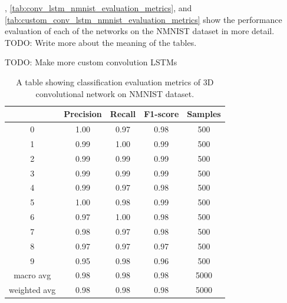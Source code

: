 , \cref{tab:conv_lstm_nmnist_evaluation_metrics}, and \cref{tab:custom_conv_lstm_nmnist_evaluation_metrics} show the performance evaluation of each of the networks on the NMNIST dataset in more detail.
\color{red} TODO: Write more about the meaning of the tables. \color{black}


\color{red} TODO: Make more custom convolution LSTMs \color{black}

\begin{table}[htb]
    \centering
    \begin{tabular}{|| c | c | c | c | c ||}
        \hline
             & Precision & Recall & F1-score & Samples \\
        \hline \hline
        0            & 1.00  & 0.97  & 0.98 & 500 \\
        \hline
        1            & 0.99  & 1.00  & 0.99 & 500 \\
        \hline
        2            & 0.99  & 0.99  & 0.99 & 500 \\
        \hline
        3            & 0.99  & 0.99  & 0.99 & 500 \\
        \hline
        4            & 0.99  & 0.97  & 0.98 & 500 \\
        \hline
        5            & 1.00  & 0.98  & 0.99 & 500 \\
        \hline
        6            & 0.97  & 1.00  & 0.98 & 500 \\
        \hline
        7            & 0.98  & 0.97  & 0.98 & 500 \\
        \hline
        8            & 0.97  & 0.97  & 0.97 & 500 \\
        \hline
        9            & 0.95  & 0.98  & 0.96 & 500 \\
        \hline
        macro avg    & 0.98  & 0.98  & 0.98 & 5000 \\
        \hline
        weighted avg & 0.98  & 0.98  & 0.98 & 5000 \\
        \hline
    \end{tabular}
    \caption{A table showing classification evaluation metrics of 3D convolutional network on NMNIST dataset.}
    \label{tab:conv3d_nmnist_evaluation_metrics}
\end{table}

